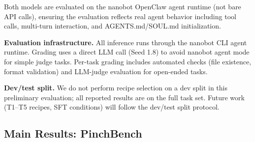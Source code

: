 Both models are evaluated on the nanobot OpenClaw agent runtime (not bare API calls), ensuring the evaluation reflects real agent behavior including tool calls, multi-turn interaction, and AGENTS.md/SOUL.md initialization.

\textbf{Evaluation infrastructure.} All inference runs through the nanobot CLI agent runtime. Grading uses a direct LLM call (Seed 1.8) to avoid nanobot agent mode for simple judge tasks. Per-task grading includes automated checks (file existence, format validation) and LLM-judge evaluation for open-ended tasks.

\textbf{Dev/test split.} We do not perform recipe selection on a dev split in this preliminary evaluation; all reported results are on the full task set. Future work (T1--T5 recipes, SFT conditions) will follow the dev/test split protocol.


\subsection{Main Results: PinchBench}
\label{sec:exp:pinchbench}

